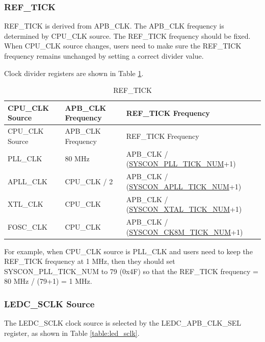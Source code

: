 \documentclass[main\_\_EN.tex]{subfiles}
\begin{document}
\subsubsection{REF\_TICK}\label{sec:ref_tick}

REF\_TICK is derived from APB\_CLK. The APB\_CLK frequency is determined by CPU\_CLK source. The REF\_TICK frequency should be fixed. When CPU\_CLK source changes, users need to make sure the REF\_TICK frequency remains unchanged by setting a correct divider value.

Clock divider registers are shown in Table \ref{table:ref_tick}.

\begin{longtable}[c]{|l|l|l|}
      \caption{REF\_TICK}
    \label{table:ref_tick}
        \\\hline
        \rowcolor{lightgray}
        CPU\_CLK Source & APB\_CLK Frequency & REF\_TICK Frequency\\
        \hline
        \endfirsthead
        \hline
        \rowcolor{lightgray}
        CPU\_CLK Source & APB\_CLK Frequency & REF\_TICK Frequency\\
        \hline
        \endhead
        \endfoot
        PLL\_CLK & 80 MHz & APB\_CLK / (\hyperref[fielddesc:SYSCONPLLTICKNUM]{SYSCON\_PLL\_TICK\_NUM}+1)\\
        \hline
        APLL\_CLK & CPU\_CLK / 2 & APB\_CLK / (\hyperref[fielddesc:SYSCONAPLLTICKNUM]{SYSCON\_APLL\_TICK\_NUM}+1)\\
        \hline
        XTL\_CLK & CPU\_CLK & APB\_CLK / (\hyperref[fielddesc:SYSCONXTALTICKNUM]{SYSCON\_XTAL\_TICK\_NUM}+1)\\
        \hline
        FOSC\_CLK & CPU\_CLK & APB\_CLK / (\hyperref[fielddesc:SYSCONCK8MTICKNUM]{SYSCON\_CK8M\_TICK\_NUM}+1)\\
        \hline
\end{longtable}

For example, when CPU\_CLK source is PLL\_CLK and users need to keep the REF\_TICK frequency at 1 MHz, then they should set SYSCON\_PLL\_TICK\_NUM to 79 (0x4F) so that the REF\_TICK frequency = 80 MHz / (79+1) = 1 MHz.

\subsubsection{LEDC\_SCLK Source}

The LEDC\_SCLK clock source is selected by the LEDC\_APB\_CLK\_SEL register, as shown in Table \ref{table:led_sclk}.
\end{document}
